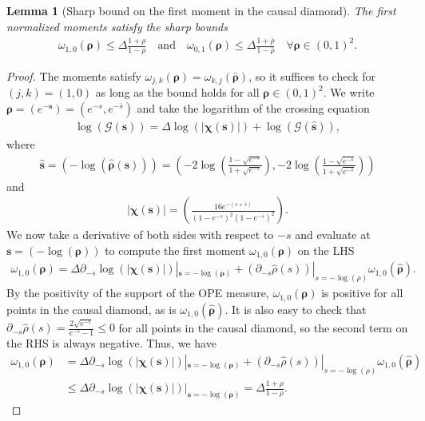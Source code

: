 \documentclass[a4paper,11pt]{article}
\theoremstyle{plain}
\newtheorem{lem}[thm]{Lemma}
\theoremstyle{definition}
\theoremstyle{remark}
\newcommand{\bs}[1]{\boldsymbol{#1}}
\newcommand{\rhob}{{\bar{\rho}}}
\newcommand{\ba}{\begin{equation} \begin{aligned}}
\newcommand{\ea}{\end{aligned} \end{equation}}
\newcommand{\De}{\Delta}
\begin{document}
\begin{appendix}
\begin{lem}[Sharp bound on the first moment in the causal diamond]
\label{sharpmomentbound}
The first normalized moments satisfy the sharp bounds
\ba
\omega_{1,0}(\bs{\rho}) \leq \De \frac{1+\rho}{1-\rho} \quad \text{and} \quad \omega_{0,1}(\bs{\rho}) \leq \De \frac{1+\rhob}{1-\rhob} \quad \forall \bs{\rho} \in (0,1)^2.
\ea
\end{lem}
\begin{proof}
The moments satisfy $\omega_{j,k}(\bs{\rho}) = \omega_{k,j}(\bar{\bs{\rho}})$, so it suffices to check for $(j,k) = (1,0)$ as long as the bound holds for all $\bs{\rho} \in (0,1)^2$. We write $\bs{\rho} = (e^{-\bs{s}}) = (e^{-s},e^{-\bar{s}})$ and take the logarithm of the crossing equation
\ba
\log(\mathcal{G}(\bs{s})) = \De \log(|\bs{\chi}(\bs{s})|) + \log( \mathcal{G}( \hat{\bs{s}} )),
\ea
where 
\ba
\hat{\bs{s}} = \left(- \log(\hat{\bs{\rho}}(\bs{s}))\right) = \left(- 2 \log\left(\frac{1-\sqrt{e^{-s}}}{1+\sqrt{e^{-s}}}\right) ,- 2 \log\left(\frac{1-\sqrt{e^{-\bar{s}}}}{1+\sqrt{e^{-\bar{s}}}}\right) \right)
\ea
and 
\ba
|\bs{\chi}(\bs{s})| = \left(  \frac{16 e^{-(s+\bar{s})}}{(1-e^{-s})^2 (1-e^{-\bar{s}})^2}\right).
\ea
We now take a derivative of both sides with respect to $-s$ and evaluate at $\bs{s} = \left(-\log(\bs{\rho}) \right)$ to compute the first moment $\omega_{1,0}(\bs{\rho})$ on the LHS
\ba
\omega_{1,0}(\bs{\rho}) = \De \partial_{-s} \log(|\bs{\chi}(\bs{s})|)|_{\bs{s} = -\log(\bs{\rho})} + \left(\partial_{-s} \hat{\rho}(s) \right)|_{s = -\log(\rho)} \omega_{1,0}(\hat{\bs{\rho}}).
\ea
By the positivity of the support of the OPE measure, $\omega_{1,0}(\bs{\rho})$ is positive for all points in the causal diamond, as is $\omega_{1,0}(\hat{\bs{\rho}})$. It is also easy to check that $\partial_{-s} \hat{\rho}(s) = \frac{2 \sqrt{e^{-s}}}{e^{-s} -1} \leq 0$ for all points in the causal diamond, so the second term on the RHS is always negative. Thus, we have
\ba
\omega_{1,0}(\bs{\rho}) &= \De \partial_{-s} \log(|\bs{\chi}(\bs{s})|)|_{\bs{s} = -\log(\bs{\rho})} + \left(\partial_{-s} \hat{\rho}(s) \right)|_{s = -\log(\rho)} \omega_{1,0}(\hat{\bs{\rho}})\\& \leq \De \partial_{-s} \log(|\bs{\chi}(\bs{s})|)|_{\bs{s} = -\log(\bs{\rho})}  = \De \frac{1+\rho}{1-\rho}.
\ea
\end{proof}


\end{appendix}
\end{document}

